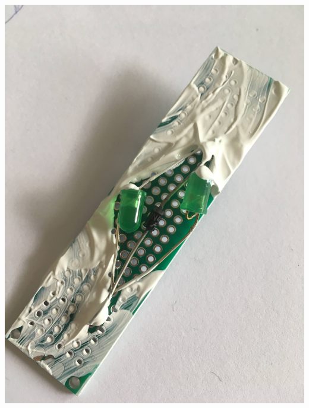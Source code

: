\documentclass[12pt, letter]{article}
\begin{document}
\includegraphics[width=\textwidth,height=\textheight,keepaspectratio]{leaf-electronics.jpg}
\newpage
\end{document}
